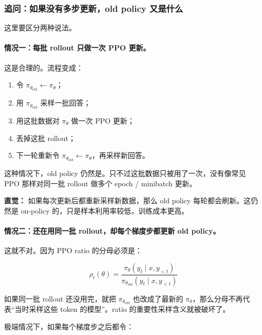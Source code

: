 \subsubsection{追问：如果没有多步更新，old policy 又是什么}

这里要区分两种说法。

\paragraph{情况一：每批 rollout 只做一次 PPO 更新。}

这是合理的。流程变成：

\begin{enumerate}[leftmargin=1.5em]
  \item 令 $\pi_{\theta_\text{old}} \leftarrow \pi_\theta$；
  \item 用 $\pi_{\theta_\text{old}}$ 采样一批回答；
  \item 用这批数据对 $\pi_\theta$ 做一次 PPO 更新；
  \item 丢掉这批 rollout；
  \item 下一轮重新令 $\pi_{\theta_\text{old}} \leftarrow \pi_\theta$，再采样新回答。
\end{enumerate}

这种情况下，old policy 仍然是。只不过这批数据只被用了一次，没有像常见 PPO 那样对同一批 rollout 做多个 epoch / minibatch 更新。

\begin{intubox}
\textbf{直觉：} 如果每次更新后都重新采样新数据，那么 old policy 每轮都会刷新。这仍然是 on-policy 的，只是样本利用率较低，训练成本更高。
\end{intubox}

\paragraph{情况二：还在用同一批 rollout，却每个梯度步都更新 old policy。}

这就不对。因为 PPO ratio 的分母必须是：

\[
\rho_t(\theta)
=
\frac{
\pi_\theta(y_t \mid x, y_{<t})
}{
\pi_{\theta_\text{old}}(y_t \mid x, y_{<t})
}
\]

如果同一批 rollout 还没用完，就把 $\pi_{\theta_\text{old}}$ 也改成了最新的 $\pi_\theta$，那么分母不再代表“当时采样这些 token 的模型”。ratio 的重要性采样含义就被破坏了。

极端情况下，如果每个梯度步之后都令：

